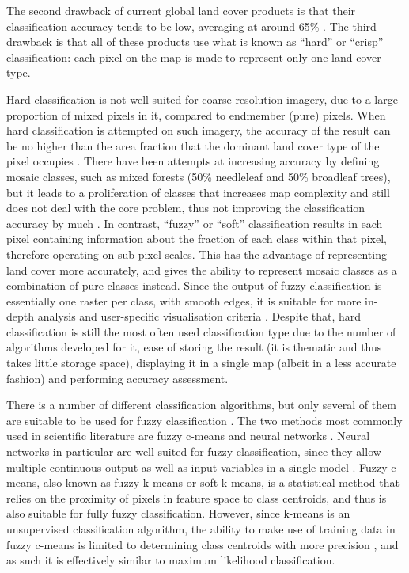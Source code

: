\documentclass[a4paper,10pt]{book}
\begin{document}
The second drawback of current global land cover products is that their classification accuracy tends to be low, averaging at around 65\% \citep{tsendbazar2016integrating}. The third drawback is that all of these products use what is known as ``hard'' or ``crisp'' classification: each pixel on the map is made to represent only one land cover type.

Hard classification is not well-suited for coarse resolution imagery, due to a large proportion of mixed pixels in it, compared to endmember (pure) pixels. When hard classification is attempted on such imagery, the accuracy of the result can be no higher than the area fraction that the dominant land cover type of the pixel occupies \citep{latifovic2004accuracy}. There have been attempts at increasing accuracy by defining mosaic classes, such as mixed forests (50\% needleleaf and 50\% broadleaf trees), but it leads to a proliferation of classes that increases map complexity and still does not deal with the core problem, thus not improving the classification accuracy by much \citep{tsendbazar2016comparative}. In contrast, ``fuzzy'' or ``soft'' classification results in each pixel containing information about the fraction of each class within that pixel, therefore operating on sub-pixel scales. This has the advantage of representing land cover more accurately, and gives the ability to represent mosaic classes as a combination of pure classes instead. Since the output of fuzzy classification is essentially one raster per class, with smooth edges, it is suitable for more in-depth analysis and user-specific visualisation criteria \citep{tsendbazar2016integrating}. Despite that, hard classification is still the most often used classification type due to the number of algorithms developed for it, ease of storing the result (it is thematic and thus takes little storage space), displaying it in a single map (albeit in a less accurate fashion) and performing accuracy assessment.

There is a number of different classification algorithms, but only several of them are suitable to be used for fuzzy classification \citep{nath2014methods}. The two methods most commonly used in scientific literature are fuzzy c-means and neural networks \citep{zhang2001fullyfuzzy}. Neural networks in particular are well-suited for fuzzy classification, since they allow multiple continuous output as well as input variables in a single model \citep{foody1997fuzzynnet}. Fuzzy c-means, also known as fuzzy k-means or soft k-means, is a statistical method that relies on the proximity of pixels in feature space to class centroids, and thus is also suitable for fully fuzzy classification. However, since k-means is an unsupervised classification algorithm, the ability to make use of training data in fuzzy c-means is limited to determining class centroids with more precision \citep{hengl2004fuzzycmeans}, and as such it is effectively similar to maximum likelihood classification.
\end{document}
